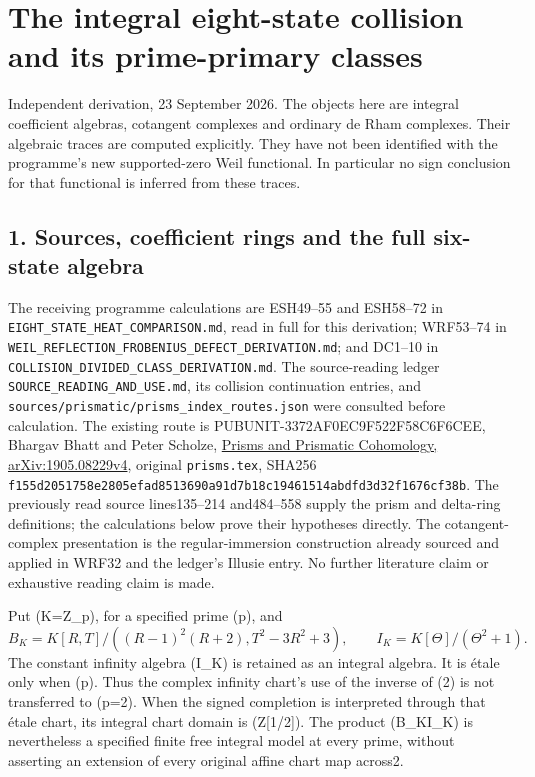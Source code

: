 \documentclass[
]{article}
\author{}
\date{}
\begin{document}
\section{The integral eight-state collision and its prime-primary
classes}\label{the-integral-eight-state-collision-and-its-prime-primary-classes}

Independent derivation, 23 September 2026. The objects here are integral
coefficient algebras, cotangent complexes and ordinary de Rham
complexes. Their algebraic traces are computed explicitly. They have not
been identified with the programme's new supported-zero Weil functional.
In particular no sign conclusion for that functional is inferred from
these traces.

\subsection{1. Sources, coefficient rings and the full six-state
algebra}\label{sources-coefficient-rings-and-the-full-six-state-algebra}

The receiving programme calculations are ESH49--55 and ESH58--72 in
\texttt{EIGHT\_STATE\_HEAT\_COMPARISON.md}, read in full for this
derivation; WRF53--74 in
\texttt{WEIL\_REFLECTION\_FROBENIUS\_DEFECT\_DERIVATION.md}; and DC1--10
in \texttt{COLLISION\_DIVIDED\_CLASS\_DERIVATION.md}. The source-reading
ledger \texttt{SOURCE\_READING\_AND\_USE.md}, its collision continuation
entries, and \texttt{sources/prismatic/prisms\_index\_routes.json} were
consulted before calculation. The existing route is
PUBUNIT-3372AF0EC9F522F58C6F6CEE, Bhargav Bhatt and Peter Scholze,
\href{https://arxiv.org/abs/1905.08229v4}{Prisms and Prismatic
Cohomology, arXiv:1905.08229v4}, original \texttt{prisms.tex}, SHA256
\texttt{f155d2051758e2805efad8513690a91d7b18c19461514abdfd3d32f1676cf38b}.
The previously read source lines135--214 and484--558 supply the prism
and delta-ring definitions; the calculations below prove their
hypotheses directly. The cotangent-complex presentation is the
regular-immersion construction already sourced and applied in WRF32 and
the ledger's Illusie entry. No further literature claim or exhaustive
reading claim is made.

Put (K=\mathbb Z\_p), for a specified prime (p), and \[
B_K=K[R,T]/((R-1)^2(R+2),T^2-3R^2+3),\qquad
I_K=K[\Theta]/(\Theta^2+1).
\tag{IEC1}
\] The constant infinity algebra (I\_K) is retained as an integral
algebra. It is étale only when (p). Thus the complex infinity
chart's use of the inverse of (2\Theta) is not transferred to (p=2).
When the signed completion is interpreted through that étale chart, its
integral chart domain is (\mathbb Z{[}1/2{]}). The product
(B\_K\times I\_K) is nevertheless a specified finite free integral model
at every prime, without asserting an extension of every original affine
chart map across2.
\end{document}

